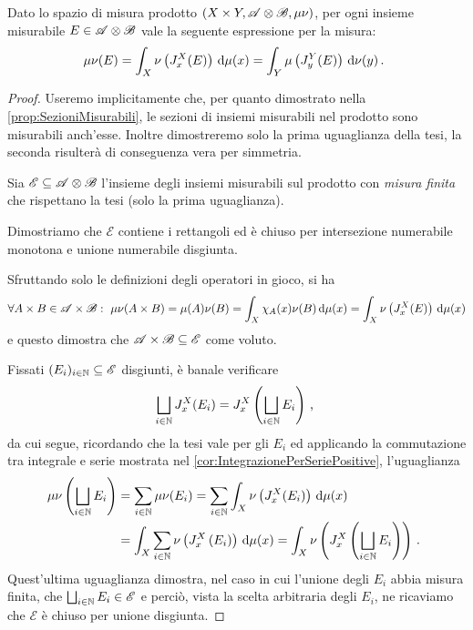 \begin{proposition}\label{prop:PreTonelli}
	Dato lo spazio di misura prodotto $(X\times Y,\mathscr A\otimes\mathscr B,\mu\nu)$, per ogni insieme misurabile $E\in\mathscr A\otimes\mathscr B$ \sigfin[o] vale la seguente espressione per la misura:
	\begin{equation*}
		\mu\nu(E)=\int_X\nu\left(J_x^X(E)\right)\,\mathrm d\mu(x)=\int_Y\mu\left(J_y^Y(E)\right)\,\mathrm d\nu(y)\, \text{. }
	\end{equation*}
\end{proposition}
\begin{proof}
	\newcommand{\E}{\ensuremath{\mathscr E}}
	Useremo implicitamente che, per quanto dimostrato nella \cref{prop:SezioniMisurabili}, le sezioni di insiemi misurabili nel prodotto sono misurabili anch'esse.
	Inoltre dimostreremo solo la prima uguaglianza della tesi, la seconda risulterà di conseguenza vera per simmetria.
	
	Sia $\E\subseteq \A\otimes\B$ l'insieme degli insiemi misurabili sul prodotto con \emph{misura finita} che rispettano la tesi (solo la prima uguaglianza).
	
	Dimostriamo che $\E$ contiene i rettangoli ed è chiuso per intersezione numerabile monotona e unione numerabile disgiunta.
	
	Sfruttando solo le definizioni degli operatori in gioco, si ha
	\begin{equation*}
		\forall A\times B\in\mathscr A\times\mathscr B:\ \mu\nu(A\times B)=\mu(A)\nu(B)=\int_X \chi_A(x)\nu(B)\,\mathrm d\mu(x)=\int_X\nu\left(J_x^X(E)\right)\,\mathrm d\mu(x)
	\end{equation*}
	e questo dimostra che $\A\times\B\subseteq \E$ come voluto.
	
	Fissati $(E_i)_{i\in\N}\subseteq \E$ disgiunti, è banale verificare
	\begin{equation*}
		\bigsqcup_{i\in\mathbb N}J_x^X(E_i)=J_x^X\left(\bigsqcup_{i\in\mathbb N}E_i\right)\, \text{, }
	\end{equation*}
	da cui segue, ricordando che la tesi vale per gli $E_i$ ed applicando la commutazione tra integrale e serie mostrata nel \cref{cor:IntegrazionePerSeriePositive}, l'uguaglianza
	\begin{align*}
		\mu\nu\left(\bigsqcup_{i\in\mathbb N}E_i\right)&=\sum_{i\in\mathbb N}\mu\nu(E_i)=\sum_{i\in\mathbb N}\int_X \nu\left(J_x^X(E_i)\right)\,\mathrm d\mu(x)\\
		&=\int_X\sum_{i\in\mathbb N}\nu\left(J_x^X\left(E_i\right)\right)\,\mathrm d\mu(x)=\int_X\nu\left(J_x^X\left(\bigsqcup_{i\in\mathbb N}E_i\right)\right)\, \text{. }
	\end{align*}
	Quest'ultima uguaglianza dimostra, nel caso in cui l'unione degli $E_i$ abbia misura finita, che $\bigsqcup_{i\in\N}E_i\in\E$ e perciò, vista la scelta arbitraria degli $E_i$, ne ricaviamo che $\E$ è chiuso per unione disgiunta.
	

\end{proof}
